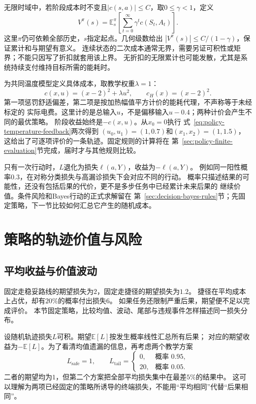 无限时域中，若阶段成本时不变且$|c(s,a)|\leq C$，取$0\leq\gamma<1$，定义
\begin{equation}
  V^\pi(s)=
  \mathbb E_s^\pi\left[\sum_{t=0}^{\infty}\gamma^t c(S_t,A_t)\right].
  \label{eq:decision-discounted-value}
\end{equation}
这里$\pi$仍可依赖全部历史，$s$指定起点。几何级数给出
$|V^\pi(s)|\leq C/(1-\gamma)$，保证累计和与期望有意义。
连续状态的二次成本通常无界，需要另证可积性或矩界；不能只因写了折扣就套用该上界。
无折扣的无限累计也可能发散，尤其是系统持续支付维持目标所需的能耗时。

为共同温度模型定义具体成本，取教学权重$\lambda=1$：
\begin{equation}
  c(x,u)=(x-2)^2+\lambda u^2,\qquad c_H(x)=(x-2)^2.
  \label{eq:policy-temperature-cost}
\end{equation}
第一项惩罚舒适偏差，第二项是按加热幅值平方计价的能耗代理，不声称等于未经标定的
实际电费。这里计的是总输入$u$，不是偏移输入$u-0.4$；两种计价会产生不同的最优策略。
阶段收益始终是$-c(x,u)$。从$x_0=0$执行
式~\eqref{eq:policy-temperature-feedback}两次得到
$(u_0,u_1)=(1,0.7)$和$(x_1,x_2)=(1,1.5)$，
这给出了可逐项评价的一条轨迹。固定规则的计算将在
第~\ref{sec:policy-finite-evaluation}节完成，届时才与其他规则比较。

只有一次行动时，$L$退化为损失$\ell(a,Y)$，收益为$-\ell(a,Y)$。
例如同一阳性概率$0.3$，在对称分类损失与高漏诊损失下会对应不同的行动。
概率只描述结果的可能性，还没有包括后果的代价，更不是多步任务中已经累计未来后果的
继续价值。条件风险和Bayes行动的正式求解留在
第~\ref{sec:decision-bayes-rules}节；先固定策略，下一节比较如何汇总它产生的随机成本。

\section{策略的轨迹价值与风险}
\label{sec:decision-risk-criteria-robustness}

\subsection{平均收益与价值波动}

固定走稳妥路线的期望损失为$2$，固定走捷径的期望损失为$1.2$。
捷径在平均成本上占优，却有$20\%$的概率付出损失$6$。
如果任务还限制严重后果，期望便不足以完成评价。
本节固定策略，比较均值、波动、尾部与违规事件怎样描述同一损失分布。

设随机轨迹损失$L$可积。期望$\mathbb E[L]$按发生概率线性汇总所有后果；
对应的期望收益为$-\mathbb E[L]$。为了看清均值遗漏的信息，再考虑两个教学方案
\[
  L_{\mathrm{safe}}=1,\qquad
  L_{\mathrm{tail}}=
  \begin{cases}
    0,&\text{概率 }0.95,\\
    20,&\text{概率 }0.05.
  \end{cases}
\]
二者的期望均为$1$，但第二个方案把全部平均损失集中在最差$5\%$的结果中。
这可以理解为两项已经固定的策略所诱导的终端损失，不能用“平均相同”代替“后果相同”。

